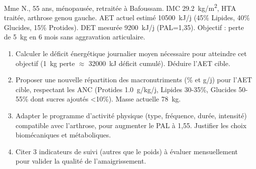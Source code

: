 \documentclass[11pt]{article}
\begin{document}
\begin{exercice}
Mme N., 55 ans, ménopausée, retraitée à Bafoussam. IMC \SI{29,2}{kg/m^2}, HTA traitée, arthrose genou gauche. AET actuel estimé \SI{10500}{kJ/j} (45\% Lipides, 40\% Glucides, 15\% Protides). DET mesurée \SI{9200}{kJ/j} (PAL=1,35). Objectif : perte de \SI{5}{kg} en 6 mois sans aggravation articulaire.
\begin{enumerate}
    \item Calculer le déficit énergétique journalier moyen nécessaire pour atteindre cet objectif (\SI{1}{kg} perte $\approx$ \SI{32000}{kJ} déficit cumulé). Déduire l'AET cible.
    \item Proposer une nouvelle répartition des macronutriments (\% et g/j) pour l'AET cible, respectant les ANC (Protides \SI{1,0}{g/kg/j}, Lipides 30-35\%, Glucides 50-55\% dont sucres ajoutés <10\%). Masse actuelle \SI{78}{kg}.
    \item Adapter le programme d'activité physique (type, fréquence, durée, intensité) compatible avec l'arthrose, pour augmenter le PAL à 1,55. Justifier les choix biomécaniques et métaboliques.
    \item Citer 3 indicateurs de suivi (autres que le poids) à évaluer mensuellement pour valider la qualité de l'amaigrissement.
\end{enumerate}
\end{exercice}
\end{document}
